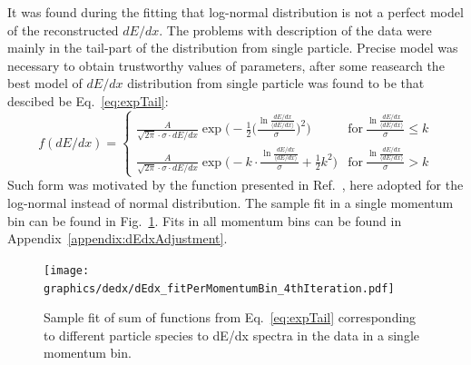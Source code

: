 It was found during the fitting that log-normal distribution is not a perfect model of the reconstructed $dE/dx$. The problems with description of the data were mainly in the tail-part of the distribution from single particle. Precise model was necessary to obtain trustworthy values of parameters, after some reasearch the best model of $dE/dx$ distribution from single particle was found to be that descibed be Eq.~\eqref{eq:expTail}:%
%
\begin{equation}\label{eq:expTail}
	f(dE/dx)=\left\{
                \begin{array}{ll}
                  \frac{A}{\sqrt{2\pi}\cdot \sigma\cdot dE/dx}\exp{\Bigg(-\frac{1}{2}\Big(\frac{\ln{\frac{dE/dx}{\langle dE/dx\rangle}}}{\sigma}\Big)^{2}\Bigg)} & \textrm{for}~\frac{\ln{\frac{dE/dx}{\langle dE/dx\rangle}}}{\sigma} \leq k \\
                  \frac{A}{\sqrt{2\pi}\cdot \sigma\cdot dE/dx}\exp{\Bigg(-k\cdot \frac{\ln{\frac{dE/dx}{\langle dE/dx\rangle}}}{\sigma} + \frac{1}{2}k^{2} \Bigg)} & \textrm{for}~\frac{\ln{\frac{dE/dx}{\langle dE/dx\rangle}}}{\sigma} > k
                \end{array}
              \right.
\end{equation}%
%
Such form was motivated by the function presented in Ref.~\cite{AlternativeToCrystallBall}, here adopted for the log-normal instead of normal distribution. The sample fit in a single momentum bin can be found in Fig.~\ref{fig:dEdxFit}. Fits in all momentum bins can be found in Appendix~\ref{appendix:dEdxAdjustment}.


\begin{figure}[ht]%
\centering%
\texttt{[image: graphics/dedx/dEdx\_fitPerMomentumBin\_4thIteration.pdf]}%
\caption[Sample fit to dE/dx spectrum in the data in single momentum bin.]%
{Sample fit of sum of functions from Eq.~\eqref{eq:expTail} corresponding to different particle species to dE/dx spectra in the data in a single momentum bin.}\label{fig:dEdxFit}
\end{figure}




